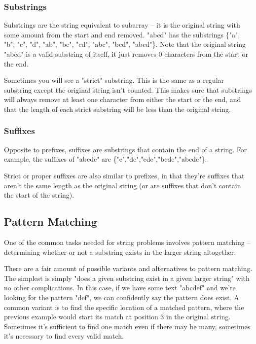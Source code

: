 \subsubsection{Substrings}

Substrings are the string equivalent to subarray -- it is the original string with some amount from the start and end removed. "abcd" has the substrings \{"a", "b", "c", "d", "ab", "bc", "cd", "abc", "bcd", "abcd"\}. Note that the original string "abcd" is a valid substring of itself, it just removes 0 characters from the start or the end.

Sometimes you will see a "strict" substring. This is the same as a regular substring except the original string isn't counted. This makes sure that substrings will always remove at least one character from either the start or the end, and that the length of each strict substring will be less than the original string.

\subsubsection{Suffixes}

Opposite to prefixes, suffixes are substrings that contain the end of a string. For example, the suffixes of "abcde" are \{"e","de","cde","bcde","abcde"\}.

Strict or proper suffixes are also similar to prefixes, in that they're suffixes that aren't the same length as the original string (or are suffixes that don't contain the start of the string).

\subsection{Pattern Matching}

One of the common tasks needed for string problems involves pattern matching -- determining whether or not a substring exists in the larger string altogether.

There are a fair amount of possible variants and alternatives to pattern matching. The simplest is simply "does a given substring exist in a given larger string" with no other complications. In this case, if we have some text "abcdef" and we're looking for the pattern "def", we can confidently say the pattern does exist. A common variant is to find the specific location of a matched pattern, where the previous example would start its match at position 3 in the original string. Sometimes it's sufficient to find one match even if there may be many, sometimes it's necessary to find every valid match.

